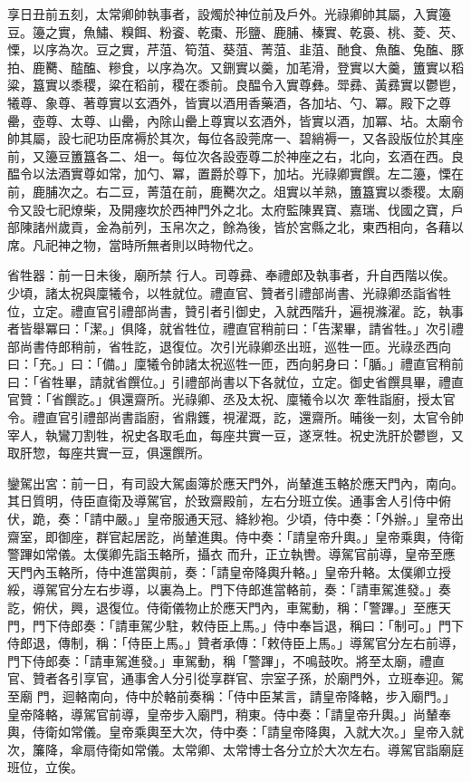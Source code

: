 \begin{pinyinscope}
 享日丑前五刻，太常卿帥執事者，設燭於神位前及戶外。光祿卿帥其屬，入實籩豆。籩之實，魚鱐、糗餌、粉餈、乾棗、形鹽、鹿脯、榛實、乾裛、桃、菱、芡、慄，以序為次。豆之實，芹菹、筍菹、葵菹、菁菹、韭菹、酏食、魚醢、兔醢、豚拍、鹿臡、醓醢、糝食，以序為次。又鉶實以羹，加芼滑，登實以大羹，簠實以稻粱，簋實以黍稷，粱在稻前，稷在黍前。良醖令入實尊彝。斝彞、黃彞實以鬱鬯，犧尊、象尊、著尊實以玄酒外，皆實以酒用香藥酒，各加坫、勺、冪。殿下之尊罍，壺尊、太尊、山罍，內除山罍上尊實以玄酒外，皆實以酒，加冪、坫。太廟令
 帥其屬，設七祀功臣席褥於其次，每位各設莞席一、碧綃褥一，又各設版位於其座前，又籩豆簠簋各二、俎一。每位次各設壺尊二於神座之右，北向，玄酒在西。良醖令以法酒實尊如常，加勺、冪，置爵於尊下，加坫。光祿卿實饌。左二籩，慄在前，鹿脯次之。右二豆，菁菹在前，鹿臡次之。俎實以羊熟，簠簋實以黍稷。太廟令又設七祀燎柴，及開瘞坎於西神門外之北。太府監陳異寶、嘉瑞、伐國之寶，戶部陳諸州歲貢，金為前列，玉帛次之，餘為後，皆於宮縣之北，東西相向，各藉以席。凡祀神之物，當時所無者則以時物代之。



 省牲器：前一日未後，廟所禁
 行人。司尊彞、奉禮郎及執事者，升自西階以俟。少頃，諸太祝與廩犧令，以牲就位。禮直官、贊者引禮部尚書、光祿卿丞詣省牲位，立定。禮直官引禮部尚書，贊引者引御史，入就西階升，遍視滌濯。訖，執事者皆舉冪曰：「潔。」俱降，就省牲位，禮直官稍前曰：「告潔畢，請省牲。」次引禮部尚書侍郎稍前，省牲訖，退復位。次引光祿卿丞出班，巡牲一匝。光祿丞西向曰：「充。」曰：「備。」廩犧令帥諸太祝巡牲一匝，西向躬身曰：「腯。」禮直官稍前曰：「省牲畢，請就省饌位。」引禮部尚書以下各就位，立定。御史省饌具畢，禮直官贊：「省饌訖。」俱還齋所。光祿卿、丞及太祝、廩犧令以次
 牽牲詣廚，授太官令。禮直官引禮部尚書詣廚，省鼎鑊，視濯溉，訖，還齋所。晡後一刻，太官令帥宰人，執鸞刀割牲，祝史各取毛血，每座共實一豆，遂烹牲。祝史洗肝於鬱鬯，又取肝惣，每座共實一豆，俱還饌所。



 鑾駕出宮：前一日，有司設大駕鹵簿於應天門外，尚輦進玉輅於應天門內，南向。其日質明，侍臣直衛及導駕官，於致齋殿前，左右分班立俟。通事舍人引侍中俯伏，跪，奏：「請中嚴。」皇帝服通天冠、絳紗袍。少頃，侍中奏：「外辦。」皇帝出齋室，即御座，群官起居訖，尚輦進輿。侍中奏：「請皇帝升輿。」皇帝乘輿，侍衛警蹕如常儀。太僕卿先詣玉輅所，攝衣
 而升，正立執轡。導駕官前導，皇帝至應天門內玉輅所，侍中進當輿前，奏：「請皇帝降輿升輅。」皇帝升輅。太僕卿立授綏，導駕官分左右步導，以裏為上。門下侍郎進當輅前，奏：「請車駕進發。」奏訖，俯伏，興，退復位。侍衛儀物止於應天門內，車駕動，稱：「警蹕。」至應天門，門下侍郎奏：「請車駕少駐，敕侍臣上馬。」侍中奉旨退，稱曰：「制可。」門下侍郎退，傳制，稱：「侍臣上馬。」贊者承傳：「敕侍臣上馬。」導駕官分左右前導，門下侍郎奏：「請車駕進發。」車駕動，稱「警蹕」，不鳴鼓吹。將至太廟，禮直官、贊者各引享官，通事舍人分引從享群官、宗室子孫，於廟門外，立班奉迎。駕至廟
 門，迴輅南向，侍中於輅前奏稱：「侍中臣某言，請皇帝降輅，步入廟門。」皇帝降輅，導駕官前導，皇帝步入廟門，稍東。侍中奏：「請皇帝升輿。」尚輦奉輿，侍衛如常儀。皇帝乘輿至大次，侍中奏：「請皇帝降輿，入就大次。」皇帝入就次，簾降，傘扇侍衛如常儀。太常卿、太常博士各分立於大次左右。導駕官詣廟庭班位，立俟。




\end{pinyinscope}
